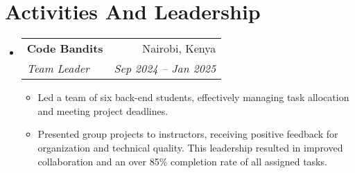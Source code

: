 \documentclass[letterpaper,11pt]{article}
\makeatletter
\newcommand{\resumeSubheading}[4]{
  \vspace{-1pt}\item
    \begin{tabular*}{0.97\textwidth}{l@{\extracolsep{\fill}}r}
      \textbf{#1} & #2 \\
      \textit{\small #3} & \textit{\small #4} \\
    \end{tabular*}\vspace{-5pt}
}
\newcommand{\resumeSubHeadingListStart}{\begin{itemize}[leftmargin=*]}
\newcommand{\resumeSubHeadingListEnd}{\end{itemize}}
\makeatother
\begin{document}
\section*{Activities And Leadership}
\resumeSubHeadingListStart
  \resumeSubheading
    {Code Bandits}{Nairobi, Kenya}
    {Team Leader}{Sep 2024 -- Jan 2025}
    \begin{itemize}
      \item Led a team of six back-end students, effectively managing task allocation and meeting project deadlines.
      \item Presented group projects to instructors, receiving positive feedback for organization and technical quality. This leadership resulted in improved collaboration and an over 85\% completion rate of all assigned tasks.
    \end{itemize}
\resumeSubHeadingListEnd
\end{document}
